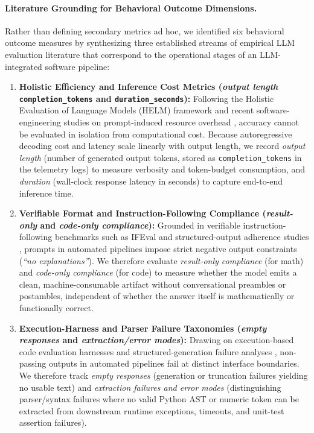 \documentclass[a4paper,fleqn]{cas-sc}
\providecommand{\tightlist}{%
  \setlength{\itemsep}{0pt}\setlength{\parskip}{0pt}}
\begin{document}
\paragraph{Literature Grounding for Behavioral Outcome Dimensions.}
Rather than defining secondary metrics ad hoc, we identified six behavioral outcome measures by synthesizing three established streams of empirical LLM evaluation literature that correspond to the operational stages of an LLM-integrated software pipeline:
\begin{enumerate}
\tightlist
\item \textbf{Holistic Efficiency and Inference Cost Metrics (\emph{output length} \texttt{completion\_tokens} and \texttt{duration\_seconds}):} Following the Holistic Evaluation of Language Models (HELM) framework \citep{liang2023helm} and recent software-engineering studies on prompt-induced resource overhead \citep{deluca2026evaluating, midolo2026guidelines, cheng2026systemprompts}, accuracy cannot be evaluated in isolation from computational cost. Because autoregressive decoding cost and latency scale linearly with output length, we record \emph{output length} (number of generated output tokens, stored as \texttt{completion\_tokens} in the telemetry logs) to measure verbosity and token-budget consumption, and \emph{duration} (wall-clock response latency in seconds) to capture end-to-end inference time.
\item \textbf{Verifiable Format and Instruction-Following Compliance (\emph{result-only} and \emph{code-only compliance}):} Grounded in verifiable instruction-following benchmarks such as IFEval \citep{zhou2023ifeval} and structured-output adherence studies \citep{liu2024structuredoutput, hua2025promptartifact}, prompts in automated pipelines impose strict negative output constraints (\emph{``no explanations''}). We therefore evaluate \emph{result-only compliance} (for math) and \emph{code-only compliance} (for code) to measure whether the model emits a clean, machine-consumable artifact without conversational preambles or postambles, independent of whether the answer itself is mathematically or functionally correct.
\item \textbf{Execution-Harness and Parser Failure Taxonomies (\emph{empty responses} and \emph{extraction/error modes}):} Drawing on execution-based code evaluation harnesses \citep{chen2021codex, austin2021mbpp, deluca2026evaluating} and structured-generation failure analyses \citep{liu2024structuredoutput, sclar2023spurious}, non-passing outputs in automated pipelines fail at distinct interface boundaries. We therefore track \emph{empty responses} (generation or truncation failures yielding no usable text) and \emph{extraction failures and error modes} (distinguishing parser/syntax failures where no valid Python AST or numeric token can be extracted from downstream runtime exceptions, timeouts, and unit-test assertion failures).
\end{enumerate}
\end{document}
